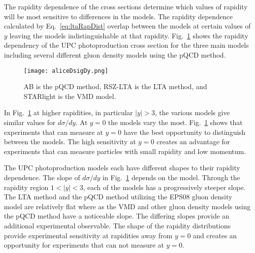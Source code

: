   The rapidity dependence of the cross sections determine which values of 
    rapidity will be most sensitive to differences in the models. 
  The rapidity dependence calculated by Eq.~\ref{eq:ltaRapDist} overlap between 
    the models at certain values of $y$ leaving the models indistinguishable at
    that rapidity.
  Fig.~\ref{fig:rapDepAll} \cite{alice2012.09} shows the rapidity dependency of 
    the UPC \JPsi{} photoproduction cross section for the three main models 
    including several different gluon density models using the pQCD method.
  \begin{figure}[h] 
    \begin{center}
      \texttt{[image: aliceDsigDy.png]}
    \end{center}
    \caption{ \label{fig:rapDepAll} AB is the pQCD method, RSZ-LTA is the LTA method, and STARlight
      is the VMD model.}
  \end{figure}
  In Fig.~\ref{fig:rapDepAll} at higher rapidities, in particular $|y|>3$, the 
    various models give similar values for $d\sigma/dy$. 
  At $y=0$ the models vary the most. 
  Fig.~\ref{fig:rapDepAll} shows that experiments that can measure \JPsi{}
    at $y=0$ have the best opportunity to distinguish between the models.
  The high sensitivity at $y=0$ creates an advantage for experiments that can 
    measure particles with small rapidity and low momentum.  
 
  The UPC photoproduction models each have different shapes to their rapidity 
    dependence. 
  The slope of $d\sigma/dy$ in Fig.~\ref{fig:rapDepAll} depends on the model. 
  Through the rapidity region $1<|y|<3$, each of the models has a progressively
    steeper slope. 
  The LTA method and the pQCD method utilizing the EPS08 gluon density model 
    are relatively flat where as the VMD and other gluon density models using
    the pQCD method have a noticeable slope.
  The differing slopes provide an additional experimental observable. 
  The shape of the rapidity distributions provide experimental sensitivity at 
    rapidities away from $y=0$ and creates an opportunity for experiments that 
    can not measure \JPsi{} at $y=0$.


